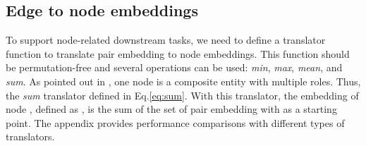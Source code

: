 \documentclass[10pt,journal,compsoc]{IEEEtran}
\begin{document}
                                                                                                                                                                                                                                                            

















































\subsection{Edge to node embeddings}
To support node-related downstream tasks, we need to define a translator function  to translate pair embedding to node embeddings. This function should be permutation-free and several operations can be used: \textit{min}, \textit{max},\textit{ mean}, and \textit{sum}. As pointed out in \cite{Epasto19}, one node is a composite entity with multiple roles. Thus, the \textit{sum} translator defined in Eq.\ref{eq:sum}. With this translator, the embedding of node , defined as , is the sum of the set of pair embedding  with  as a starting point. The appendix provides performance comparisons with different types of translators.
\end{document}
